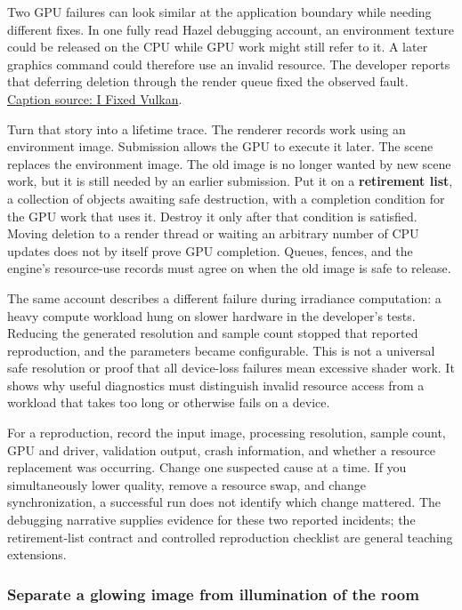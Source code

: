 \hypertarget{06-engine-ii-ch026-separate-a-dead-resource-from-an-unfinished-workload}{}

Two GPU failures can look similar at the application boundary while needing different fixes. In one fully read Hazel debugging account, an environment texture could be released on the CPU while GPU work might still refer to it. A later graphics command could therefore use an invalid resource. The developer reports that deferring deletion through the render queue fixed the observed fault. \href{https://www.youtube.com/watch?v=EXgXMa5kapI}{Caption source: I Fixed Vulkan}.

Turn that story into a lifetime trace. The renderer records work using an environment image. Submission allows the GPU to execute it later. The scene replaces the environment image. The old image is no longer wanted by new scene work, but it is still needed by an earlier submission. Put it on a \textbf{retirement list}, a collection of objects awaiting safe destruction, with a completion condition for the GPU work that uses it. Destroy it only after that condition is satisfied. Moving deletion to a render thread or waiting an arbitrary number of CPU updates does not by itself prove GPU completion. Queues, fences, and the engine's resource-use records must agree on when the old image is safe to release.

The same account describes a different failure during irradiance computation: a heavy compute workload hung on slower hardware in the developer's tests. Reducing the generated resolution and sample count stopped that reported reproduction, and the parameters became configurable. This is not a universal safe resolution or proof that all device-loss failures mean excessive shader work. It shows why useful diagnostics must distinguish invalid resource access from a workload that takes too long or otherwise fails on a device.

For a reproduction, record the input image, processing resolution, sample count, GPU and driver, validation output, crash information, and whether a resource replacement was occurring. Change one suspected cause at a time. If you simultaneously lower quality, remove a resource swap, and change synchronization, a successful run does not identify which change mattered. The debugging narrative supplies evidence for these two reported incidents; the retirement-list contract and controlled reproduction checklist are general teaching extensions.

\subsubsection{Separate a glowing image from illumination of the room}\label{06-engine-ii-ch026-separate-a-glowing-image-from-illumination-of-the-room}

